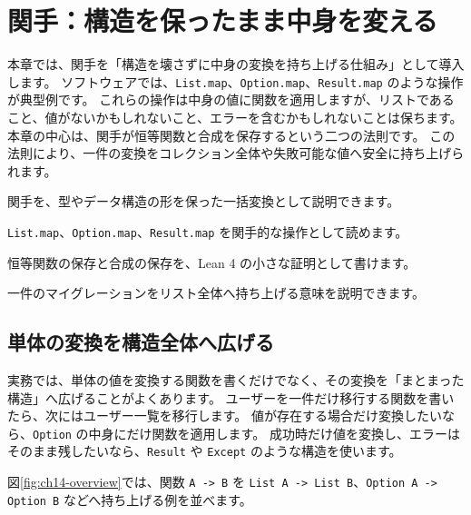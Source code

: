 \chapter{関手：構造を保ったまま中身を変える}
\label{chap:ch14_functor}

\begin{chapterabstract}
本章では、関手を「構造を壊さずに中身の変換を持ち上げる仕組み」として導入します。
ソフトウェアでは、\texttt{List.map}、\texttt{Option.map}、\texttt{Result.map} のような操作が典型例です。
これらの操作は中身の値に関数を適用しますが、リストであること、値がないかもしれないこと、エラーを含むかもしれないことは保ちます。
本章の中心は、関手が恒等関数と合成を保存するという二つの法則です。
この法則により、一件の変換をコレクション全体や失敗可能な値へ安全に持ち上げられます。
\end{chapterabstract}

\begin{learninggoals}
\item 関手を、型やデータ構造の形を保った一括変換として説明できます。
\item \texttt{List.map}、\texttt{Option.map}、\texttt{Result.map} を関手的な操作として読めます。
\item 恒等関数の保存と合成の保存を、Lean 4 の小さな証明として書けます。
\item 一件のマイグレーションをリスト全体へ持ち上げる意味を説明できます。
\end{learninggoals}

\section{単体の変換を構造全体へ広げる}

実務では、単体の値を変換する関数を書くだけでなく、その変換を「まとまった構造」へ広げることがよくあります。
ユーザーを一件だけ移行する関数を書いたら、次にはユーザー一覧を移行します。
値が存在する場合だけ変換したいなら、\texttt{Option} の中身にだけ関数を適用します。
成功時だけ値を変換し、エラーはそのまま残したいなら、\texttt{Result} や \texttt{Except} のような構造を使います。

図\ref{fig:ch14-overview}では、関数 \texttt{A -> B} を \texttt{List A -> List B}、\texttt{Option A -> Option B} などへ持ち上げる例を並べます。


